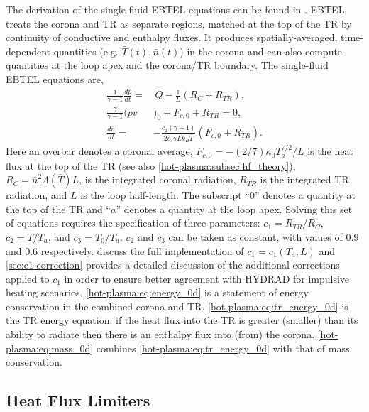 The derivation of the single-fluid EBTEL equations can be found in \citep[and see \autoref{sec:ebtel}]{klimchuk_highly_2008,cargill_enthalpy-based_2012}. EBTEL treats the corona and TR as separate regions, matched at the top of the TR by continuity of conductive and enthalpy fluxes. It produces spatially-averaged, time-dependent quantities (e.g. $\bar{T}(t),\bar{n}(t)$) in the corona and can also compute quantities at the loop apex and the corona/TR boundary. The single-fluid EBTEL equations are,
\begin{align}
    \frac{1}{\gamma - 1}\frac{d\bar{p}}{dt} =& \,\bar{Q} - \frac{1}{L}(R_C + R_{TR}), \label{hot-plasma:eq:energy_0d} \\
    \frac{\gamma}{\gamma - 1}(pv&)_0 + F_{c,0} + R_{TR} = 0, \label{hot-plasma:eq:tr_energy_0d} \\
    \frac{d\bar{n}}{dt} =& -\frac{c_2(\gamma - 1)}{2c_3\gamma Lk_B\bar{T}}(F_{c,0} + R_{TR}).\label{hot-plasma:eq:mass_0d}
\end{align}
Here an overbar denotes a coronal average, $F_{c,0} = -(2/7)\kappa_0 T_a^{7/2}/L$ is the heat flux at the top of the TR (see also \autoref{hot-plasma:subsec:hf_theory}), $R_C=\bar{n}^2\Lambda(\bar{T})L$, is the integrated coronal radiation, $R_{TR}$ is the integrated TR radiation, and $L$ is the loop half-length. The subscript ``0'' denotes a quantity at the top of the TR and ``$a$'' denotes a quantity at the loop apex. Solving this set of equations requires the specification of three parameters:  $c_1=R_{TR}/R_C$, $c_2=\bar{T}/T_a$, and $c_3=T_0/T_a$. $c_2$ and $c_3$ can be taken as constant, with values of 0.9 and 0.6 respectively. \citet{cargill_enthalpy-based_2012} discuss the full implementation of $c_1 = c_1(T_a,L)$ and \autoref{sec:c1-correction} provides a detailed discussion of the additional corrections applied to $c_1$ in order to ensure better agreement with HYDRAD for impulsive heating scenarios. \autoref{hot-plasma:eq:energy_0d} is a statement of energy conservation in the combined corona and TR. \autoref{hot-plasma:eq:tr_energy_0d} is the TR energy equation: if the heat flux into the TR is greater (smaller) than its ability to radiate then there is an enthalpy flux into (from) the corona. \autoref{hot-plasma:eq:mass_0d} combines \autoref{hot-plasma:eq:tr_energy_0d} with that of mass conservation.

\subsection{Heat Flux Limiters}\label{hot-plasma:subsec:hf_theory}
    
